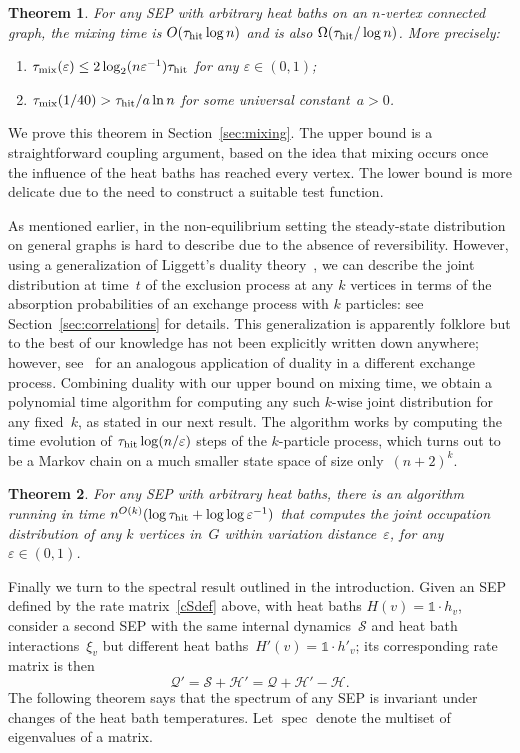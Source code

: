 \documentclass[11pt]{article}
\theoremstyle{plain}
\newtheorem{theorem}{Theorem}%
\theoremstyle{definition}
\theoremstyle{remark}
\numberwithin{equation}{section}
\newcommand{\cH}{{\mathcal H}}
\newcommand{\cS}{{\mathcal S}}
\DeclareMathOperator{\spec}{spec}
\newcommand{\one}{\mathbb{1}}
\renewcommand{\cS}{{\mathcal Q}}
\newcommand{\cSin}{{\mathcal S}}
\newcommand{\tmix}{\tau_{\rm mix}}
\newcommand{\hit}{\tau_{\rm hit}}
\begin{document}
\begin{theorem}\label{thm:mixing}
For any SEP with arbitrary heat baths on an $n$-vertex connected graph, the mixing time is $O(\hit\log n)$
and is also $\Omega(\hit/\log n)$.  More precisely:
\begin{enumerate}
\item[(a)] $\tmix(\varepsilon)\le 2\log_2(n\varepsilon^{-1})\hit$ for any $\varepsilon\in(0,1)$;
\item[(b)] $\tmix(1/40) > \hit/a\ln n$ for some universal constant~$a>0$.
\end{enumerate}
\end{theorem}

We prove this theorem in Section~\ref{sec:mixing}.  The upper bound is a straightforward coupling argument, 
based on the idea that mixing occurs once the influence of the heat baths has reached every vertex.  The lower
bound is more delicate due to the need to construct a suitable test function.

As mentioned earlier, in the non-equilibrium setting the steady-state distribution on general graphs is
hard to describe due to the absence of reversibility.  However, using a generalization of Liggett's duality
theory~\cite[Chap.~VIII, Thm.~1.1]{Liggett85}, we can describe the joint
distribution at time~$t$ of the exclusion process at any $k$ vertices in terms of the absorption 
probabilities of an exchange process with $k$ particles: see Section~\ref{sec:correlations} for details. 
This generalization is apparently folklore but to the best of our knowledge has not been explicitly written down anywhere;  
however, see~\cite{KipnisMP82} for an analogous application of duality in a different exchange process.  
Combining duality with our upper bound on mixing time, we obtain a polynomial time 
algorithm for computing any such $k$-wise joint distribution for any fixed~$k$, as stated in our next result.
The algorithm works by computing the time evolution of $\hit\log(n/\varepsilon)$ steps of the $k$-particle
process, which turns out to be a Markov chain on a much smaller state space of size only~$(n+2)^k$.
\begin{theorem}\label{thm:kwise}
For any SEP with arbitrary heat baths, there is an algorithm running in time $n^{O(k)}(\log \hit +\log\log\varepsilon^{-1})$ that
computes the joint occupation distribution of any $k$ vertices in~$G$ within variation distance~$\varepsilon$, 
for any $\varepsilon\in(0,1)$.
\end{theorem}

Finally we turn to the spectral result outlined in the introduction.
Given an SEP defined by the rate matrix~\eqref{cSdef} above, 
with heat baths $H(v)=\one\cdot h_v$,
consider a second SEP with the same internal dynamics~$\cSin$ and heat bath interactions~$\xi_v$
but different heat baths~$H'(v)=\one\cdot h'_v$; its corresponding rate matrix is then
\begin{equation}\label{cSdef'}
 \cS'  = \cSin+\cH' = \cS +\cH' -\cH.
\end{equation}
The following theorem says that the spectrum of any SEP is invariant under changes of the
heat bath temperatures.  Let $\spec$ denote the multiset of eigenvalues of a matrix.
\end{document}
